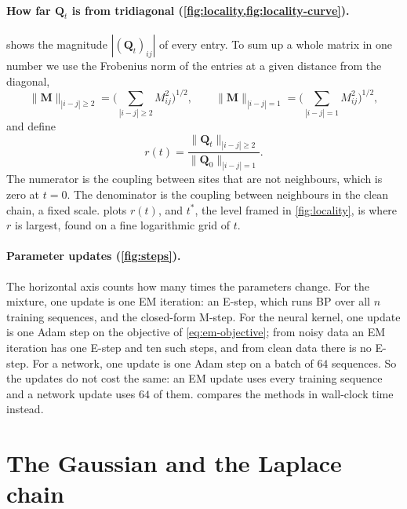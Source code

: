 \documentclass{article}
\begin{document}
\paragraph{How far $\mathbf Q_t$ is from tridiagonal (\cref{fig:locality,fig:locality-curve}).} 
shows the magnitude $|(\mathbf Q_t)_{ij}|$ of every entry. To sum up a whole matrix in one number we use the Frobenius
norm of the entries at a given distance from the diagonal,
\begin{equation}
  \|\mathbf M\|_{|i-j|\ge2}=\Big(\sum_{|i-j|\ge2}M_{ij}^2\Big)^{1/2},
  \qquad
  \|\mathbf M\|_{|i-j|=1}=\Big(\sum_{|i-j|=1}M_{ij}^2\Big)^{1/2},
\end{equation}
and define
\begin{equation}
  r(t)=\frac{\|\mathbf Q_t\|_{|i-j|\ge2}}{\|\mathbf Q_0\|_{|i-j|=1}} .
\end{equation}
The numerator is the coupling between sites that are not neighbours, which is zero at $t=0$. The denominator is the
coupling between neighbours in the clean chain, a fixed scale.  plots $r(t)$, and $t^{*}$,
the level framed in \cref{fig:locality}, is where $r$ is largest, found on a fine logarithmic grid of $t$.

\paragraph{Parameter updates (\cref{fig:steps}).} The horizontal axis counts how many times the parameters change. For
the mixture, one update is one EM iteration: an E-step, which runs BP over all $n$ training sequences, and the
closed-form M-step. For the neural kernel, one update is one Adam step on the objective of \cref{eq:em-objective}; from noisy data
an EM iteration has one E-step and ten such steps, and from clean data there is no E-step. For a network, one update is
one Adam step on a batch of $64$ sequences. So the updates do not cost the same: an EM update uses every training
sequence and a network update uses $64$ of them.  compares the methods in wall-clock time instead.

\section{The Gaussian and the Laplace chain}
\label{app:gaussian-laplace}
\end{document}
